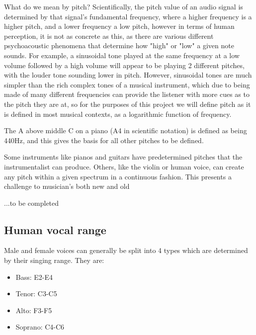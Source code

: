	What do we mean by pitch? Scientifically, the pitch value of an audio signal is determined by that signal's fundamental frequency, where a higher frequency is a higher pitch, and a lower frequency a low pitch, however in terms of human perception, it is not as concrete as this, as there are various different psychoacoustic phenomena that determine how "high" or "low" a given note sounds. For example, a sinusoidal tone played at the same frequency at a low volume followed by a high volume will appear to be playing 2 different pitches, with the louder tone sounding lower in pitch. However, sinusoidal tones are much simpler than the rich complex tones of a musical instrument, which due to being made of many different frequencies can provide the listener with more cues as to the pitch they are at, so for the purposes of this project we will define pitch as it is defined in most musical contexts, as a logarithmic function of frequency.
	
	The A above middle C on a piano (A4 in scientific notation) is defined as being 440Hz, and this gives the basis for all other pitches to be defined.
	
	Some instruments like pianos and guitars have predetermined pitches that the instrumentalist can produce. Others, like the violin or human voice, can create any pitch within a given spectrum in a continuous fashion. This presents a challenge to musician's both new and old 
	
	...to be completed
	
	\subsection{Human vocal range}
	Male and female voices can generally be split into 4 types which are determined by their singing range. They are:
	\begin{itemize}
		\item Bass: E2-E4
		\item Tenor: C3-C5
		\item Alto: F3-F5
		\item Soprano: C4-C6
	\end{itemize}
